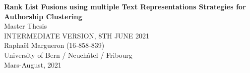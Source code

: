 \documentclass{article}
\theoremstyle{definition}
\begin{document}
\setcounter{page}{-1}

\date{Mars-August, 2021}
\author{Raphaël Margueron}

\begin{titlepage}
\vspace*{\fill}
\begin{center}
{\LARGE \textbf{Rank List Fusions using multiple Text Representations Strategies for Authorship Clustering}}
\\[0.5cm]
{\large Master Thesis}
\\[0.5cm]
{\large \color{red} INTERMEDIATE VERSION, 8TH JUNE 2021}
\\[8.0cm]
{\large Raphaël Margueron (16-858-839)}
\\[0.5cm]
{\large University of Bern / Neuchâtel / Fribourg}
\\[0.5cm]
{\large Mars-August, 2021}
\\[0.5cm]
\end{center}
\vspace*{\fill}
\end{titlepage}

\onecolumn


\twocolumn
{}







\onecolumn
{}
\renewcommand{\thesubsection}{\Alph{subsection}}
\renewcommand{\thetable}{\Alph{table}}
\renewcommand{\thefigure}{\Alph{figure}}
\setcounter{subsection}{0}
\setcounter{table}{0}
\setcounter{figure}{0}


\clearpage

\end{document}
